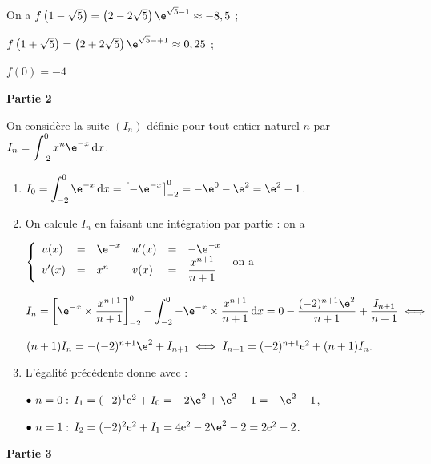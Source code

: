 \begin{enumerate}
On a $f\left(1 - \sqrt 5\right) = \left(2 - 2\sqrt 5 \right)\e^{\sqrt 5 - 1} \approx - 8,5$ ;

$f\left(1 + \sqrt 5\right) = \left(2 + 2\sqrt 5 \right)\e^{\sqrt 5 -+ 1} \approx 0,25$ ;

$f(0) = - 4$
\end{enumerate}

\bigskip

\textbf{Partie 2}

\medskip

On considère la suite $(I_n)$ définie pour tout entier naturel $n$ par $I_n = \displaystyle\int_{-2}^0 x^n\e^{-x}\, \text{d}x$.

\medskip

\begin{enumerate}
\item 
$I_0 = \displaystyle\int_{-2}^0 \e^{-x}\, \text{d}x = \left[- \e^{-x}\right]_{-2}^0 = - \e^{0} - \e^{2} = \e^2 - 1$.
\item 
On calcule $I_n$ en faisant une intégration par partie : on a 

$\left\{\begin{array}{l c l l c l}
u(x) &=& \e^{-x}&u'(x) &=& - \e^{-x}\\
v'(x)&=&x^n&v(x) &=&\dfrac{x^{n+1}}{n+1}\\
\end{array}\right.$ on a 

$I_n = \left[\e^{-x} \times \dfrac{x^{n+1}}{n+1}\right]_{-2}^0
 - \displaystyle\int_{-2}^0 - \e^{-x} \times \dfrac{x^{n+1}}{n+1}\, \text{d}x = 0 - \dfrac{(-2)^{n+1}\e^{2}}{n + 1} + \dfrac{I_{n+1}}{n + 1} \iff $
 
 $(n + 1)I_n = -(- 2)^{n+1}\e^2 + I_{n+1} \iff I_{n+1} = (- 2)^{n+1} \text{e}^2 + (n + 1)I_n.$


\item
L'égalité précédente donne avec :

$\bullet~n = 0 :\, I_{1} = (- 2)^{1}\text{e}^2 + I_0 = - 2\e^{2} + \e^{2} - 1 = -\e^{2} - 1$,

$\bullet~n = 1 :\, I_{2} = (- 2)^{2} \text{e}^2 + I_1 = 4 \text{e}^2  - 2\e^{2} - 2 = 2\text{e}^2 - 2$.
\end{enumerate}

\medskip

\textbf{Partie 3}

\medskip

